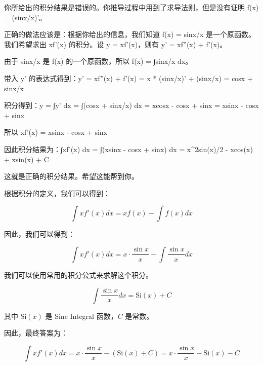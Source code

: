 你所给出的积分结果是错误的。你推导过程中用到了求导法则，但是没有证明 f(x) = (sinx/x)'。

正确的做法应该是：根据你给出的信息，我们知道 f(x) = sinx/x 是一个原函数。我们希望求出 xf'(x) 的积分。设 y = xf'(x)，则有 y' = xf''(x) + f'(x)。

由于 sinx/x 是 f(x) 的一个原函数，所以 f(x) = ∫sinx/x dx。

带入 y' 的表达式得到：y' = xf''(x) + f'(x) = x * (sinx/x)' + (sinx/x) = cosx + sinx/x

积分得到：y = ∫y' dx = ∫(cosx + sinx/x) dx = xcosx - cosx + sinx = xsinx - cosx + sinx

所以 xf'(x) = xsinx - cosx + sinx

因此积分结果为：∫xf'(x) dx = ∫(xsinx - cosx + sinx) dx = x^2sin(x)/2 - xcos(x) + xsin(x) + C

这就是正确的积分结果。希望这能帮到你。


根据积分的定义，我们可以得到：

$$\int xf'(x) dx = xf(x) - \int f(x) dx$$

因此，我们可以得到：

$$\int xf'(x) dx = x \cdot \frac{\sin x}{x} - \int \frac{\sin x}{x} dx$$

我们可以使用常用的积分公式来求解这个积分。

$$\int \frac{\sin x}{x} dx = \text{Si}(x) + C$$

其中 $\text{Si}(x)$ 是 Sine Integral 函数，$C$ 是常数。

因此，最终答案为：

$$\int xf'(x) dx = x \cdot \frac{\sin x}{x} - (\text{Si}(x) + C) = \boxed{x \cdot \frac{\sin x}{x} - \text{Si}(x) - C}$$